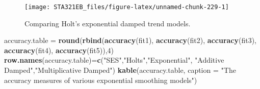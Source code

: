 \documentclass[
]{book}
\newenvironment{Shaded}{\begin{snugshade}}{\end{snugshade}}
\newcommand{\AttributeTok}[1]{\textcolor[rgb]{0.13,0.29,0.53}{#1}}
\newcommand{\DecValTok}[1]{\textcolor[rgb]{0.00,0.00,0.81}{#1}}
\newcommand{\DocumentationTok}[1]{\textcolor[rgb]{0.56,0.35,0.01}{\textbf{\textit{#1}}}}
\newcommand{\FloatTok}[1]{\textcolor[rgb]{0.00,0.00,0.81}{#1}}
\newcommand{\FunctionTok}[1]{\textcolor[rgb]{0.13,0.29,0.53}{\textbf{#1}}}
\newcommand{\NormalTok}[1]{#1}
\newcommand{\OtherTok}[1]{\textcolor[rgb]{0.56,0.35,0.01}{#1}}
\newcommand{\SpecialCharTok}[1]{\textcolor[rgb]{0.81,0.36,0.00}{\textbf{#1}}}
\newcommand{\StringTok}[1]{\textcolor[rgb]{0.31,0.60,0.02}{#1}}
\begin{document}
\begin{Shaded}
\end{Shaded}

\begin{figure}

{\centering \texttt{[image: STA321EB\_files/figure-latex/unnamed-chunk-229-1]} 

}

\caption{Comparing Holt's exponential damped trend models.}\label{fig:unnamed-chunk-229}
\end{figure}

\begin{Shaded}
\begin{Highlighting}[]
\NormalTok{accuracy.table }\OtherTok{=} \FunctionTok{round}\NormalTok{(}\FunctionTok{rbind}\NormalTok{(}\FunctionTok{accuracy}\NormalTok{(fit1), }\FunctionTok{accuracy}\NormalTok{(fit2), }\FunctionTok{accuracy}\NormalTok{(fit3), }
                             \FunctionTok{accuracy}\NormalTok{(fit4), }\FunctionTok{accuracy}\NormalTok{(fit5)),}\DecValTok{4}\NormalTok{)}
\FunctionTok{row.names}\NormalTok{(accuracy.table)}\OtherTok{=}\FunctionTok{c}\NormalTok{(}\StringTok{"SES"}\NormalTok{,}\StringTok{"Holt\textquotesingle{}s"}\NormalTok{,}\StringTok{"Exponential"}\NormalTok{,}
                    \StringTok{"Additive Damped"}\NormalTok{,}\StringTok{"Multiplicative Damped"}\NormalTok{)}
\FunctionTok{kable}\NormalTok{(accuracy.table, }\AttributeTok{caption =} \StringTok{"The accuracy measures of various exponential }
\StringTok{      smoothing models"}\NormalTok{)}
\end{Highlighting}
\end{Shaded}
\end{document}
